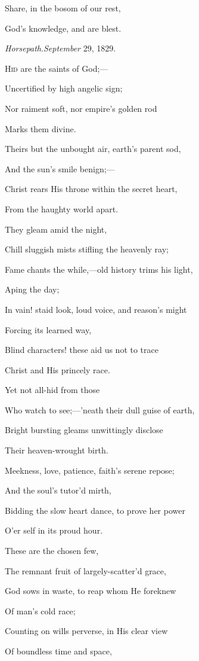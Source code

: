 Share, in the bosom of our rest,

God's knowledge, and are blest.

\emph{Horsepath}.\emph{September} 29, 1829.


H\textsc{id} are
the saints of God;—

Uncertified by high angelic sign;

Nor raiment soft, nor empire's golden rod

Marks them divine.

Theirs but the unbought air, earth's parent sod,

And the
sun's smile benign;—

Christ rears His throne within the secret heart,

From
the haughty world apart.

They
gleam amid the night,

Chill sluggish mists stifling the heavenly ray;

Fame chants the while,—old history trims his light,

Aping the day;

In vain! staid look, loud voice, and reason's might

Forcing
its learned way,

Blind characters! these aid us not to trace

Christ
and His princely race. 

Yet not
all-hid from those

Who watch to see;—'neath their dull guise of earth,

Bright bursting gleams unwittingly disclose

Their heaven-wrought birth.

Meekness, love, patience, faith's serene repose;

And the
soul's tutor'd mirth,

Bidding the slow heart dance, to prove her power

O'er
self in its proud hour.

These are
the chosen few,

The remnant fruit of largely-scatter'd grace,

God sows in waste, to reap whom He foreknew

Of man's cold race;

Counting on wills perverse, in His clear view

Of
boundless time and space,

